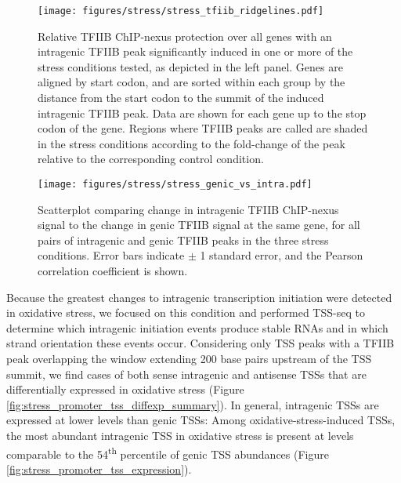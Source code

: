 \begin{sidewaysfigure}
    \texttt{[image: figures/stress/stress\_tfiib\_ridgelines.pdf]}
    \caption[TFIIB ChIP-nexus protection over all genes with stress-induced intragenic TFIIB peaks.]{Relative TFIIB ChIP-nexus protection over all genes with an intragenic TFIIB peak significantly induced in one or more of the stress conditions tested, as depicted in the left panel. Genes are aligned by start codon, and are sorted within each group by the distance from the start codon to the summit of the induced intragenic TFIIB peak. Data are shown for each gene up to the stop codon of the gene. Regions where TFIIB peaks are called are shaded in the stress conditions according to the fold-change of the peak relative to the corresponding control condition.}
    \label{fig:stress_tfiib_ridgelines}
\end{sidewaysfigure}

\begin{figure}[h]
    \texttt{[image: figures/stress/stress\_genic\_vs\_intra.pdf]}
    \label{fig:stress_genic_vs_intra}
    \caption[Scatterplot of change in intragenic versus genic TFIIB ChIP-nexus signal, for all pairs of intragenic and genic TFIIB peaks in the three stress conditions.]{Scatterplot comparing change in intragenic TFIIB ChIP-nexus signal to the change in genic TFIIB signal at the same gene, for all pairs of intragenic and genic TFIIB peaks in the three stress conditions. Error bars indicate $\pm$ 1 standard error, and the Pearson correlation coefficient is shown.}
\end{figure}

Because the greatest changes to intragenic transcription initiation were detected in oxidative stress, we focused on this condition and performed TSS-seq to determine which intragenic initiation events produce stable RNAs and in which strand orientation these events occur.
Considering only TSS peaks with a TFIIB peak overlapping the window extending 200 base pairs upstream of the TSS summit, we find cases of both sense intragenic and antisense TSSs that are differentially expressed in oxidative stress (Figure \ref{fig:stress_promoter_tss_diffexp_summary}).
In general, intragenic TSSs are expressed at lower levels than genic TSSs: Among oxidative-stress-induced TSSs, the most abundant intragenic TSS in oxidative stress is present at levels comparable to the 54\textsuperscript{th} percentile of genic TSS abundances (Figure \ref{fig:stress_promoter_tss_expression}).

